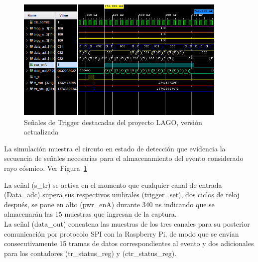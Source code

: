 \begin{figure}[H]
\centering
\includegraphics[width=0.9\textwidth]{Figs/trigernevo.PNG} 
\caption{Señales de Trigger destacadas del proyecto LAGO, versión actualizada}
\label{tigeer}
\end{figure}

La simulación muestra el circuto en estado de detección que evidencia la secuencia de señales necesarias para el almacenamiento del evento considerado rayo cósmico. Ver Figura~\ref{tigeer}

La señal (s\_tr) se activa en el momento que cualquier canal de entrada (Data\_adc) supera sus respectivos umbrales (trigger\_set), dos ciclos de reloj después, se pone en alto (pwr\_enA) durante 340 ns indicando que se almacenarán las 15 muestras que ingresan de la captura.\\
La señal (data\_out) concatena las muestras de los tres canales para su posterior comunicación por protocolo SPI con la Raspberry Pi, de modo que se envían consecutivamente 15 tramas de datos correspondientes al evento y dos adicionales para los contadores (tr\_status\_reg) y (ctr\_status\_reg).






